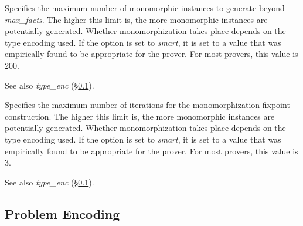 \documentclass[a4paper,12pt]{article}
\newcommand\const[1]{\textsf{#1}}
\begin{document}
\begin{enum}
Specifies the maximum number of monomorphic instances to generate beyond
\textit{max\_facts}. The higher this limit is, the more monomorphic instances
are potentially generated. Whether monomorphization takes place depends on the
type encoding used. If the option is set to \textit{smart}, it is set to a value
that was empirically found to be appropriate for the prover. For most provers,
this value is 200.

\nopagebreak
{\small See also \textit{type\_enc} (\S\ref{problem-encoding}).}

Specifies the maximum number of iterations for the monomorphization fixpoint
construction. The higher this limit is, the more monomorphic instances are
potentially generated. Whether monomorphization takes place depends on the
type encoding used. If the option is set to \textit{smart}, it is set to a value
that was empirically found to be appropriate for the prover. For most provers,
this value is 3.

\nopagebreak
{\small See also \textit{type\_enc} (\S\ref{problem-encoding}).}
\end{enum}

\subsection{Problem Encoding}
\label{problem-encoding}

\newcommand\comb[1]{\const{#1}}
\end{document}
